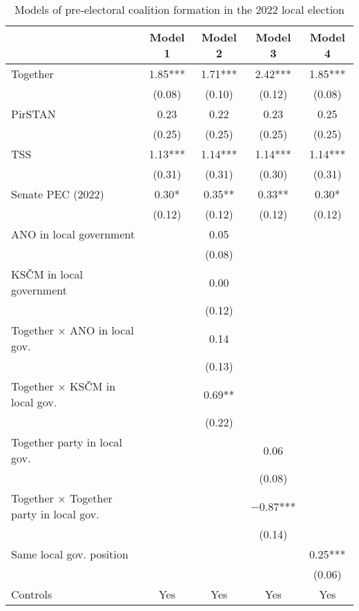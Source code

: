 \begin{table}
\centering
\caption{Models of pre-electoral coalition formation in the 2022 local election \label{tab:2}}
\begin{tabular}[t]{lcccc}
\toprule
  & Model 1 & Model 2 & Model 3 & Model 4\\
\midrule
Together & \num{1.85}*** & \num{1.71}*** & \num{2.42}*** & \num{1.85}***\\
 & (\num{0.08}) & (\num{0.10}) & (\num{0.12}) & (\num{0.08})\\
PirSTAN & \num{0.23} & \num{0.22} & \num{0.23} & \num{0.25}\\
 & (\num{0.25}) & (\num{0.25}) & (\num{0.25}) & (\num{0.25})\\
TSS & \num{1.13}*** & \num{1.14}*** & \num{1.14}*** & \num{1.14}***\\
 & (\num{0.31}) & (\num{0.31}) & (\num{0.30}) & (\num{0.31})\\
Senate PEC (2022) & \num{0.30}* & \num{0.35}** & \num{0.33}** & \num{0.30}*\\
 & (\num{0.12}) & (\num{0.12}) & (\num{0.12}) & (\num{0.12})\\
ANO in local government &  & \num{0.05} &  & \\
 &  & (\num{0.08}) &  & \\
KSČM in local government &  & \num{0.00} &  & \\
 &  & (\num{0.12}) &  & \\
Together × ANO in local gov. &  & \num{0.14} &  & \\
 &  & (\num{0.13}) &  & \\
Together × KSČM in local gov. &  & \num{0.69}** &  & \\
 &  & (\num{0.22}) &  & \\
Together party in local gov. &  &  & \num{0.06} & \\
 &  &  & (\num{0.08}) & \\
Together × Together party in local gov. &  &  & \num{-0.87}*** & \\
 &  &  & (\num{0.14}) & \\
Same local gov. position &  &  &  & \num{0.25}***\\
 &  &  &  & (\num{0.06})\\
Controls & Yes & Yes & Yes & Yes \\

\end{tabular}
\end{table}
